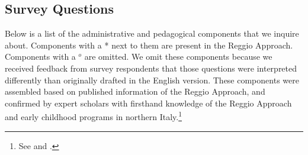 
\subsection{Survey Questions}
Below is a list of the administrative and pedagogical components that we inquire about. Components with a * next to them are present in the Reggio Approach. Components with a $^o$ are omitted. We omit these components because we received feedback from survey respondents that those questions were interpreted differently than originally drafted in the English version. These components were assembled based on published information of the Reggio Approach, and confirmed by expert scholars with firsthand knowledge of the Reggio Approach and early childhood programs in northern Italy.\footnote{See \citet{Edwards-etal-eds_1998_Hundred-Languages} and \citet{Corsaro_2008_Policy-Practice}.}

